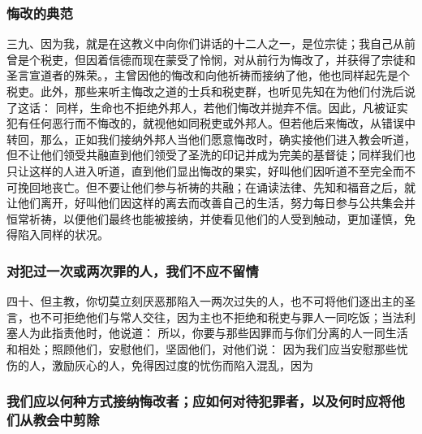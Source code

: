 
\subsubsection{悔改的典范}

三九、因为我，就是在这教义中向你们讲话的十二人之一，是位宗徒；我自己从前曾是个税吏，但因着信德而现在蒙受了怜悯，对从前行为悔改了，并获得了宗徒和圣言宣道者的殊荣。，主曾因他的悔改和向他祈祷而接纳了他，他也同样起先是个税吏。此外，那些来听主悔改之道的士兵和税吏群，也听见先知在为他们付洗后说了这话：  同样，生命也不拒绝外邦人，若他们悔改并抛弃不信。因此，凡被证实犯有任何恶行而不悔改的，就视他如同税吏或外邦人。但若他后来悔改，从错误中转回，那么，正如我们接纳外邦人当他们愿意悔改时，确实接他们进入教会听道，但不让他们领受共融直到他们领受了圣洗的印记并成为完美的基督徒；同样我们也只让这样的人进入听道，直到他们显出悔改的果实，好叫他们因听道不至完全而不可挽回地丧亡。但不要让他们参与祈祷的共融；在诵读法律、先知和福音之后，就让他们离开，好叫他们因这样的离去而改善自己的生活，努力每日参与公共集会并恒常祈祷，以便他们最终也能被接纳，并使看见他们的人受到触动，更加谨慎，免得陷入同样的状况。\par


\subsubsection{对犯过一次或两次罪的人，我们不应不留情}

四十、但主教，你切莫立刻厌恶那陷入一两次过失的人，也不可将他们逐出主的圣言，也不可拒绝他们与常人交往，因为主也不拒绝和税吏与罪人一同吃饭；当法利塞人为此指责他时，他说道：  所以，你要与那些因罪而与你们分离的人一同生活和相处；照顾他们，安慰他们，坚固他们，对他们说：  因为我们应当安慰那些忧伤的人，激励灰心的人，免得因过度的忧伤而陷入混乱，因为\par


\subsubsection{我们应以何种方式接纳悔改者；应如何对待犯罪者，以及何时应将他们从教会中剪除}

